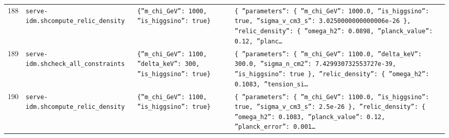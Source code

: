 \documentclass[11pt,a4paper]{article}
\begin{document}
\begin{longtable}{@{}p{}p{}p{}p{}@{}}
188 & \texttt{serve-idm.sh}\newline\texttt{compute\_\allowbreak{}relic\_\allowbreak{}density} & \texttt{\{''m\_\allowbreak{}chi\_\allowbreak{}GeV'':\allowbreak{} 1000,\allowbreak{} ''is\_\allowbreak{}higgsino'':\allowbreak{} true\}\allowbreak{}} & \texttt{\{   ''parameters'':\allowbreak{} \{     ''m\_\allowbreak{}chi\_\allowbreak{}GeV'':\allowbreak{} 1000.0,\allowbreak{}     ''is\_\allowbreak{}higgsino'':\allowbreak{} true,\allowbreak{}     ''sigma\_\allowbreak{}v\_\allowbreak{}cm3\_\allowbreak{}s'':\allowbreak{} 3.0250000000000006e-26   \}\allowbreak{},\allowbreak{}   ''relic\_\allowbreak{}density'':\allowbreak{} \{     ''omega\_\allowbreak{}h2'':\allowbreak{} 0.0898,\allowbreak{}     ''planck\_\allowbreak{}value'':\allowbreak{} 0.12,\allowbreak{}     ''planc\ldots{}\allowbreak{}} \\
189 & \texttt{serve-idm.sh}\newline\texttt{check\_\allowbreak{}all\_\allowbreak{}constraints} & \texttt{\{''m\_\allowbreak{}chi\_\allowbreak{}GeV'':\allowbreak{} 1100,\allowbreak{} ''delta\_\allowbreak{}keV'':\allowbreak{} 300,\allowbreak{} ''is\_\allowbreak{}higgsino'':\allowbreak{} true\}\allowbreak{}} & \texttt{\{   ''parameters'':\allowbreak{} \{     ''m\_\allowbreak{}chi\_\allowbreak{}GeV'':\allowbreak{} 1100.0,\allowbreak{}     ''delta\_\allowbreak{}keV'':\allowbreak{} 300.0,\allowbreak{}     ''sigma\_\allowbreak{}n\_\allowbreak{}cm2'':\allowbreak{} 7.429930732553727e-39,\allowbreak{}     ''is\_\allowbreak{}higgsino'':\allowbreak{} true   \}\allowbreak{},\allowbreak{}   ''relic\_\allowbreak{}density'':\allowbreak{} \{     ''omega\_\allowbreak{}h2'':\allowbreak{} 0.1083,\allowbreak{}     ''tension\_\allowbreak{}si\ldots{}\allowbreak{}} \\
190 & \texttt{serve-idm.sh}\newline\texttt{compute\_\allowbreak{}relic\_\allowbreak{}density} & \texttt{\{''m\_\allowbreak{}chi\_\allowbreak{}GeV'':\allowbreak{} 1100,\allowbreak{} ''is\_\allowbreak{}higgsino'':\allowbreak{} true\}\allowbreak{}} & \texttt{\{   ''parameters'':\allowbreak{} \{     ''m\_\allowbreak{}chi\_\allowbreak{}GeV'':\allowbreak{} 1100.0,\allowbreak{}     ''is\_\allowbreak{}higgsino'':\allowbreak{} true,\allowbreak{}     ''sigma\_\allowbreak{}v\_\allowbreak{}cm3\_\allowbreak{}s'':\allowbreak{} 2.5e-26   \}\allowbreak{},\allowbreak{}   ''relic\_\allowbreak{}density'':\allowbreak{} \{     ''omega\_\allowbreak{}h2'':\allowbreak{} 0.1083,\allowbreak{}     ''planck\_\allowbreak{}value'':\allowbreak{} 0.12,\allowbreak{}     ''planck\_\allowbreak{}error'':\allowbreak{} 0.001\ldots{}\allowbreak{}} \\

\end{longtable}
\end{document}
